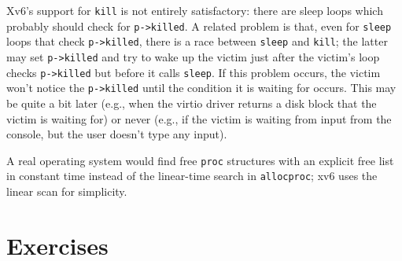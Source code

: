 Xv6's support for
\lstinline{kill}
is not entirely satisfactory: there are sleep loops
which probably should check for
\lstinline{p->killed}.
A related problem is that, even for 
\lstinline{sleep}
loops that check
\lstinline{p->killed},
there is a race between 
\lstinline{sleep}
and
\lstinline{kill};
the latter may set
\lstinline{p->killed}
and try to wake up the victim just after the victim's loop
checks
\lstinline{p->killed}
but before it calls
\lstinline{sleep}.
If this problem occurs, the victim won't notice the
\lstinline{p->killed}
until the condition it is waiting for occurs. This may be quite a bit later
(e.g., when the virtio driver returns a disk block that the victim is waiting for) or never
(e.g., if the victim is waiting from input from the console, but the user
doesn't type any input).

A real operating system would find free
\lstinline{proc}
structures with an explicit free list
in constant time instead of the linear-time search in
\lstinline{allocproc};
xv6 uses the linear scan for simplicity.
\section{Exercises}

